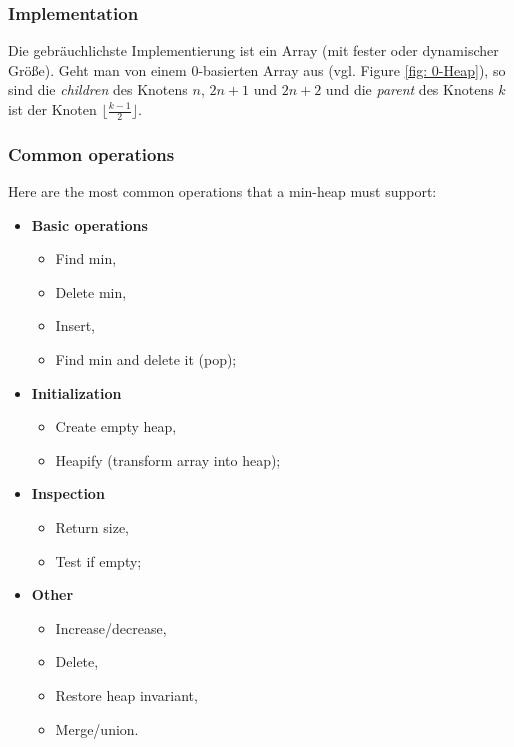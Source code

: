 \documentclass[a4paper]{article}
\begin{document}
\subsubsection*{Implementation}
Die gebräuchlichste Implementierung ist ein Array (mit fester oder dynamischer Größe). Geht man von einem 0-basierten Array aus (vgl. Figure \ref{fig: 0-Heap}), so sind die \textit{children} des Knotens $n$, $2n+1$ und $2n+2$ und die \textit{parent} des Knotens $k$ ist der Knoten $\lfloor \frac{k-1}{2}\rfloor$.

\newpage
\subsubsection*{Common operations} \label{common operations}
Here are the most common operations that a min-heap must support:
\begin{itemize}
\item \textbf{Basic operations}
  \begin{itemize}
  \item Find min,
  \item Delete min,
  \item Insert,
  \item Find min and delete it (pop);
  \end{itemize}
\item \textbf{Initialization}
  \begin{itemize}
  \item Create empty heap,
  \item Heapify (transform array into heap);
  \end{itemize}
\item\textbf{Inspection}
  \begin{itemize}
  \item Return size,
  \item Test if empty;
  \end{itemize}
\item \textbf{Other}
  \begin{itemize}
  \item Increase/decrease,
  \item Delete,
  \item Restore heap invariant,
  \item Merge/union.
  \end{itemize}
\end{itemize}
\end{document}
